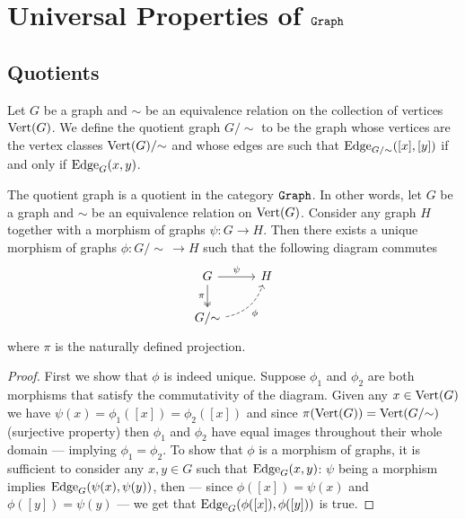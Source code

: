 \section{Universal Properties of \texorpdfstring{\({\texttt{Graph}}\)}{Graph}}

\subsection{Quotients}

\begin{definition}[Quotient]\label{def: quotient-graph}
    Let \(G\) be a graph and \(\sim\) be an equivalence relation on the collection
    of vertices \(\operatorname{Vert}(G)\). We define the quotient graph \(G/{\sim}\) to be the graph
    whose vertices are the vertex classes \(\operatorname{Vert}(G)/{\sim}\) and whose edges are
    such that \(\operatorname{Edge}_{G/{\sim}}([x], [y])\) if and only if \(\operatorname{Edge}_G(x, y)\).
\end{definition}

\begin{proposition}
    \label{prop: quotient-graph}
    The quotient graph is a quotient in the category \({\texttt{Graph}}\). In other words,
    let \(G\) be a graph and \(\sim\) be an equivalence relation on \(\operatorname{Vert}(G)\).
    Consider any graph \(H\) together with a morphism of graphs \(\psi: G \to H\).
    Then there exists a unique morphism of graphs \(\phi: G/{\sim}\, \to H\) such
    that the following diagram commutes
    \[
        \begin{tikzcd}
            G \ar[d, two heads, swap, "\pi"] \ar[r, "\psi"] &H \\
            G/{\sim} \ar[ur, swap, bend right, dashed, "\phi"] &
        \end{tikzcd}
    \]
    where \(\pi\) is the naturally defined projection.
\end{proposition}

\begin{proof}
    First we show that \(\phi\) is indeed unique. Suppose \(\phi_1\) and
    \(\phi_2\) are both morphisms that satisfy the commutativity of the diagram.
    Given any \(x \in \operatorname{Vert}(G)\) we have \(\psi(x) = \phi_1([x]) = \phi_2([x])\) and
    since \(\pi(\operatorname{Vert}(G)) = \operatorname{Vert}(G/{\sim})\) (surjective property) then \(\phi_1\) and
    \(\phi_2\) have equal images throughout their whole domain --- implying
    \(\phi_1 = \phi_2\). To show that \(\phi\) is a morphism of graphs, it is
    sufficient to consider any \(x, y \in G\) such that \(\operatorname{Edge}_G(x, y)\): \(\psi\)
    being a morphism implies \(\operatorname{Edge}_G(\psi(x), \psi(y))\), then --- since \(\phi([x])
    = \psi(x)\) and \(\phi([y]) = \psi(y)\) --- we get that \(\operatorname{Edge}_G(\phi([x]),
    \phi([y]))\) is true.
\end{proof}

